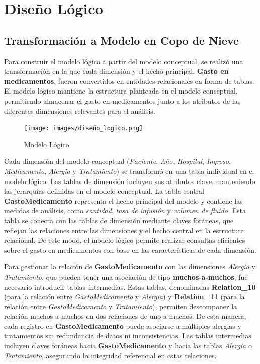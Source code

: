\documentclass{article}
\begin{document}
\section{Diseño Lógico}
\label{sec:diseno_logico}
\subsection{Transformación a Modelo en Copo de Nieve}
Para construir el modelo lógico a partir del modelo conceptual, se realizó una transformación en la que cada dimensión y el hecho principal, \textbf{Gasto en medicamentos}, fueron convertidos en entidades relacionales en forma de tablas. El modelo lógico mantiene la estructura planteada en el modelo conceptual, permitiendo almacenar el gasto en medicamentos junto a los atributos de las diferentes dimensiones relevantes para el análisis.



\begin{figure}[H]
	\centering
	\texttt{[image: images/diseño\_logico.png]}
	\caption{Modelo Lógico}
	\label{fig:logico}
\end{figure}
Cada dimensión del modelo conceptual (\textit{Paciente}, \textit{Año}, \textit{Hospital}, \textit{Ingreso}, \textit{Medicamento}, \textit{Alergia} y \textit{Tratamiento}) se transformó en una tabla individual en el modelo lógico. Las tablas de dimensión incluyen sus atributos clave, manteniendo las jerarquías definidas en el modelo conceptual. La tabla central \textbf{GastoMedicamento} representa el hecho principal del modelo y contiene las medidas de análisis, como \textit{cantidad}, \textit{tasa de infusión} y \textit{volumen de fluido}. Esta tabla se conecta con las tablas de dimensión mediante claves foráneas, que reflejan las relaciones entre las dimensiones y el hecho central en la estructura relacional. De este modo, el modelo lógico permite realizar consultas eficientes sobre el gasto en medicamentos con base en las características de cada dimensión.

Para gestionar la relación de \textbf{GastoMedicamento} con las dimensiones \textit{Alergia} y \textit{Tratamiento}, que pueden tener una asociación de tipo \textbf{muchos-a-muchos}, fue necesario introducir tablas intermedias. Estas tablas, denominadas \textbf{Relation\_10} (para la relación entre \textit{GastoMedicamento} y \textit{Alergia}) y \textbf{Relation\_11} (para la relación entre \textit{GastoMedicamento} y \textit{Tratamiento}), permiten descomponer la relación muchos-a-muchos en dos relaciones de uno-a-muchos. De esta manera, cada registro en \textbf{GastoMedicamento} puede asociarse a múltiples alergias y tratamientos sin redundancia de datos ni inconsistencias. Las tablas intermedias incluyen claves foráneas hacia \textbf{GastoMedicamento} y hacia las tablas \textit{Alergia} o \textit{Tratamiento}, asegurando la integridad referencial en estas relaciones.
\end{document}
